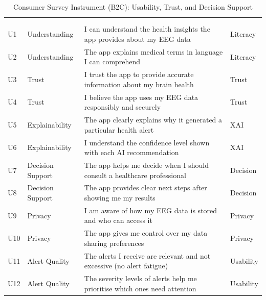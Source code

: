 {\tablestripes\tablefontsize
\begin{xltabular}{\textwidth}{@{} >{\raggedright\arraybackslash}p{0.5cm} >{\raggedright\arraybackslash}p{2.5cm} L p{1.5cm} @{}}
\caption[Consumer Survey Instrument (B2C): Usability, Trust, and]{Consumer Survey Instrument (B2C): Usability, Trust, and Decision Support}\label{app_tab:consumer_survey} \\
\toprule
\thead{\#} &  &  &  \\
\midrule
\endfirsthead
{} \\
\toprule
\thead{\#} &  &  &  \\
\midrule
\endhead
\bottomrule
\endlastfoot
U1 & Understanding & I can understand the health insights the app provides about my EEG data & Literacy \\
\addlinespace
U2 & Understanding & The app explains medical terms in language I can comprehend & Literacy \\
\addlinespace
U3 & Trust & I trust the app to provide accurate information about my brain health & Trust \\
\addlinespace
U4 & Trust & I believe the app uses my EEG data responsibly and securely & Trust \\
\addlinespace
U5 & Explainability & The app clearly explains why it generated a particular health alert & XAI \\
\addlinespace
U6 & Explainability & I understand the confidence level shown with each AI recommendation & XAI \\
\addlinespace
U7 & Decision Support & The app helps me decide when I should consult a healthcare professional & Decision \\
\addlinespace
U8 & Decision Support & The app provides clear next steps after showing me my results & Decision \\
\addlinespace
U9 & Privacy & I am aware of how my EEG data is stored and who can access it & Privacy \\
\addlinespace
U10 & Privacy & The app gives me control over my data sharing preferences & Privacy \\
\addlinespace
U11 & Alert Quality & The alerts I receive are relevant and not excessive (no alert fatigue) & Usability \\
\addlinespace
U12 & Alert Quality & The severity levels of alerts help me prioritise which ones need attention & Usability \\

\end{xltabular}}
